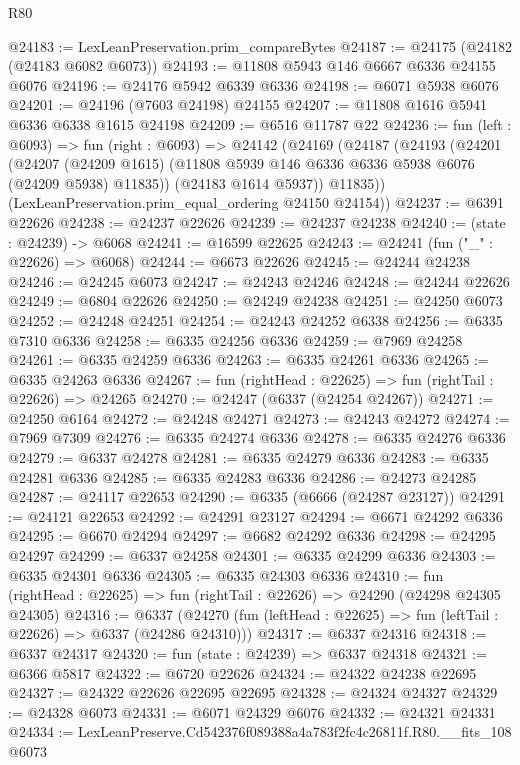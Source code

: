\begin{lexlean}{R80}
\begin{coremodule}
@24183 := LexLeanPreservation.prim_compareBytes
@24187 := @24175 (@24182 (@24183 @6082 @6073))
@24193 := @11808 @5943 @146 @6667 @6336 @24155 @6076
@24196 := @24176 @5942 @6339 @6336
@24198 := @6071 @5938 @6076
@24201 := @24196 (@7603 @24198) @24155
@24207 := @11808 @1616 @5941 @6336 @6338 @1615 @24198
@24209 := @6516 @11787 @22
@24236 := fun (left : @6093) =>
  fun (right : @6093) =>
  @24142
    (@24169
      (@24187
        (@24193
          (@24201
            (@24207
              (@24209 @1615)
              (@11808 @5939 @146 @6336 @6336 @5938 @6076 (@24209 @5938) @11835))
            (@24183 @1614 @5937))
          @11835))
      (LexLeanPreservation.prim_equal_ordering @24150 @24154))
@24237 := @6391 @22626
@24238 := @24237 @22626
@24239 := @24237 @24238
@24240 := (state : @24239) -> @6068
@24241 := @16599 @22625
@24243 := @24241 (fun ("_" : @22626) => @6068)
@24244 := @6673 @22626
@24245 := @24244 @24238
@24246 := @24245 @6073
@24247 := @24243 @24246
@24248 := @24244 @22626
@24249 := @6804 @22626
@24250 := @24249 @24238
@24251 := @24250 @6073
@24252 := @24248 @24251
@24254 := @24243 @24252 @6338
@24256 := @6335 @7310 @6336
@24258 := @6335 @24256 @6336
@24259 := @7969 @24258
@24261 := @6335 @24259 @6336
@24263 := @6335 @24261 @6336
@24265 := @6335 @24263 @6336
@24267 := fun (rightHead : @22625) => fun (rightTail : @22626) => @24265
@24270 := @24247 (@6337 (@24254 @24267))
@24271 := @24250 @6164
@24272 := @24248 @24271
@24273 := @24243 @24272
@24274 := @7969 @7309
@24276 := @6335 @24274 @6336
@24278 := @6335 @24276 @6336
@24279 := @6337 @24278
@24281 := @6335 @24279 @6336
@24283 := @6335 @24281 @6336
@24285 := @6335 @24283 @6336
@24286 := @24273 @24285
@24287 := @24117 @22653
@24290 := @6335 (@6666 (@24287 @23127))
@24291 := @24121 @22653
@24292 := @24291 @23127
@24294 := @6671 @24292 @6336
@24295 := @6670 @24294
@24297 := @6682 @24292 @6336
@24298 := @24295 @24297
@24299 := @6337 @24258
@24301 := @6335 @24299 @6336
@24303 := @6335 @24301 @6336
@24305 := @6335 @24303 @6336
@24310 := fun (rightHead : @22625) => fun (rightTail : @22626) => @24290 (@24298 @24305 @24305)
@24316 := @6337
    (@24270 (fun (leftHead : @22625) => fun (leftTail : @22626) => @6337 (@24286 @24310)))
@24317 := @6337 @24316
@24318 := @6337 @24317
@24320 := fun (state : @24239) => @6337 @24318
@24321 := @6366 @5817
@24322 := @6720 @22626
@24324 := @24322 @24238 @22695
@24327 := @24322 @22626 @22695 @22695
@24328 := @24324 @24327
@24329 := @24328 @6073
@24331 := @6071 @24329 @6076
@24332 := @24321 @24331
@24334 := LexLeanPreserve.Cd542376f089388a4a783f2fc4c26811f.R80.__fits_108 @6073

\end{coremodule}
\end{lexlean}
